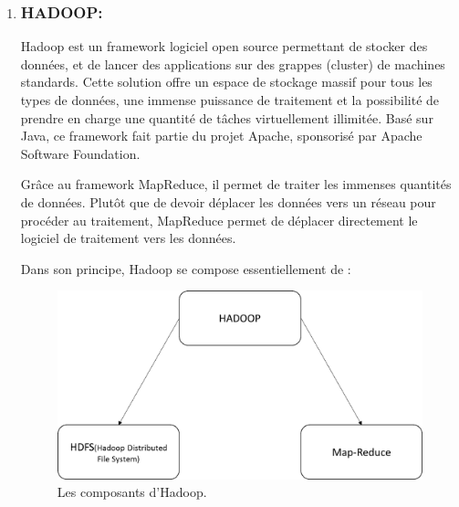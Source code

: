 \begin{enumerate}
\item \subsubsection{HADOOP:}
Hadoop est un framework logiciel open source permettant de stocker des données, et de lancer des applications sur des grappes (cluster) de machines standards. Cette solution offre un espace de stockage massif pour tous les types de données, une immense puissance de traitement et la possibilité de prendre en charge une quantité de tâches virtuellement illimitée. Basé sur Java, ce framework fait partie du projet Apache, sponsorisé par Apache Software Foundation.

Grâce au framework MapReduce, il permet de traiter les immenses quantités de données. Plutôt que de devoir déplacer les données vers un réseau pour procéder au traitement, MapReduce permet de déplacer directement le logiciel de traitement vers les données. 

Dans son principe, Hadoop se compose essentiellement de :

\begin{figure}[h]
 \centering
 \includegraphics[scale=0.6]{img/fig6_}
 \caption{Les composants d'Hadoop.}
\end{figure}


\end{enumerate}
